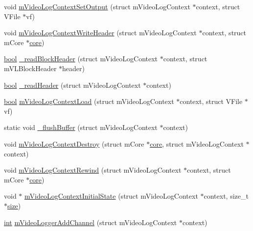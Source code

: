 \begin{DoxyCompactItemize}
void \mbox{\hyperlink{video-logger_8c_a89d33ff62ba22b7fcd0fe5e895b4c95e}{m\+Video\+Log\+Context\+Set\+Output}} (struct m\+Video\+Log\+Context $\ast$context, struct V\+File $\ast$vf)
\item 
void \mbox{\hyperlink{video-logger_8c_a53b5285dc89f4789592daef5ba376368}{m\+Video\+Log\+Context\+Write\+Header}} (struct m\+Video\+Log\+Context $\ast$context, struct m\+Core $\ast$\mbox{\hyperlink{libretro_8c_a0fa20029c1b76361c88b7c2b13e89aff}{core}})
\item 
\mbox{\hyperlink{libretro_8h_a4a26dcae73fb7e1528214a068aca317e}{bool}} \mbox{\hyperlink{video-logger_8c_abb929a40c45d70202af57598a73f625a}{\+\_\+read\+Block\+Header}} (struct m\+Video\+Log\+Context $\ast$context, struct m\+V\+L\+Block\+Header $\ast$header)
\item 
\mbox{\hyperlink{libretro_8h_a4a26dcae73fb7e1528214a068aca317e}{bool}} \mbox{\hyperlink{video-logger_8c_ac5911963671b26f1d64938bcf9ac6648}{\+\_\+read\+Header}} (struct m\+Video\+Log\+Context $\ast$context)
\item 
\mbox{\hyperlink{libretro_8h_a4a26dcae73fb7e1528214a068aca317e}{bool}} \mbox{\hyperlink{video-logger_8c_ab20aa19e19c6e5eb89100137495bfef1}{m\+Video\+Log\+Context\+Load}} (struct m\+Video\+Log\+Context $\ast$context, struct V\+File $\ast$vf)
\item 
static void \mbox{\hyperlink{video-logger_8c_a7a65448771b3eb66410f5d1e4537e322}{\+\_\+flush\+Buffer}} (struct m\+Video\+Log\+Context $\ast$context)
\item 
void \mbox{\hyperlink{video-logger_8c_a300bc3d5849465d59ddaa92e6a338fb6}{m\+Video\+Log\+Context\+Destroy}} (struct m\+Core $\ast$\mbox{\hyperlink{libretro_8c_a0fa20029c1b76361c88b7c2b13e89aff}{core}}, struct m\+Video\+Log\+Context $\ast$context)
\item 
void \mbox{\hyperlink{video-logger_8c_aea08663b76690e7220b3f8377f971785}{m\+Video\+Log\+Context\+Rewind}} (struct m\+Video\+Log\+Context $\ast$context, struct m\+Core $\ast$\mbox{\hyperlink{libretro_8c_a0fa20029c1b76361c88b7c2b13e89aff}{core}})
\item 
void $\ast$ \mbox{\hyperlink{video-logger_8c_aa9a3f77cb1a532bdc62db67c0724697f}{m\+Video\+Log\+Context\+Initial\+State}} (struct m\+Video\+Log\+Context $\ast$context, size\+\_\+t $\ast$\mbox{\hyperlink{ioapi_8h_a014d89bd76f74ef3a29c8f04b473eb76}{size}})
\item 
\mbox{\hyperlink{ioapi_8h_a787fa3cf048117ba7123753c1e74fcd6}{int}} \mbox{\hyperlink{video-logger_8c_a27685ba414aed35c5b92736c0ef21ebe}{m\+Video\+Logger\+Add\+Channel}} (struct m\+Video\+Log\+Context $\ast$context)

\end{DoxyCompactItemize}
